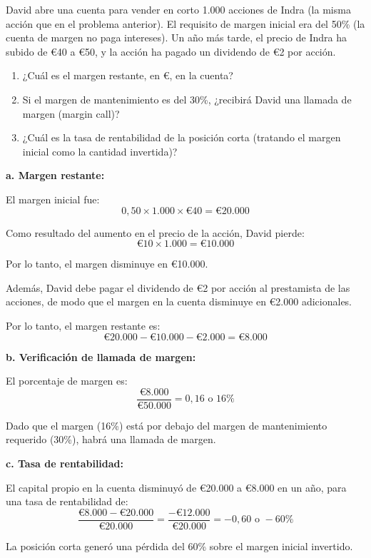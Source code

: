 \begin{ejercicio}
David abre una cuenta para vender en corto 1.000 acciones de Indra (la misma acción que en el problema anterior). El requisito de margen inicial era del 50\% (la cuenta de margen no paga intereses). Un año más tarde, el precio de Indra ha subido de €40 a €50, y la acción ha pagado un dividendo de €2 por acción.

\begin{enumerate}
\item ¿Cuál es el margen restante, en €, en la cuenta?
\item Si el margen de mantenimiento es del 30\%, ¿recibirá David una llamada de margen (margin call)?
\item ¿Cuál es la tasa de rentabilidad de la posición corta (tratando el margen inicial como la cantidad invertida)?
\end{enumerate}
\end{ejercicio}

\begin{solucion}[Ejercicio 2]
\textbf{a. Margen restante:}

El margen inicial fue:
\begin{equation}
0,50 \times 1.000 \times €40 = €20.000
\end{equation}

Como resultado del aumento en el precio de la acción, David pierde:
\begin{equation}
€10 \times 1.000 = €10.000
\end{equation}

Por lo tanto, el margen disminuye en €10.000.

Además, David debe pagar el dividendo de €2 por acción al prestamista de las acciones, de modo que el margen en la cuenta disminuye en €2.000 adicionales.

Por lo tanto, el margen restante es:
\begin{equation}
€20.000 - €10.000 - €2.000 = €8.000
\end{equation}

\textbf{b. Verificación de llamada de margen:}

El porcentaje de margen es:
\begin{equation}
\frac{€8.000}{€50.000} = 0,16 \text{ o } 16\%
\end{equation}

Dado que el margen (16\%) está por debajo del margen de mantenimiento requerido (30\%), habrá una llamada de margen.

\textbf{c. Tasa de rentabilidad:}

El capital propio en la cuenta disminuyó de €20.000 a €8.000 en un año, para una tasa de rentabilidad de:
\begin{equation}
\frac{€8.000 - €20.000}{€20.000} = \frac{-€12.000}{€20.000} = -0,60 \text{ o } -60\%
\end{equation}

La posición corta generó una pérdida del 60\% sobre el margen inicial invertido.
\end{solucion}

